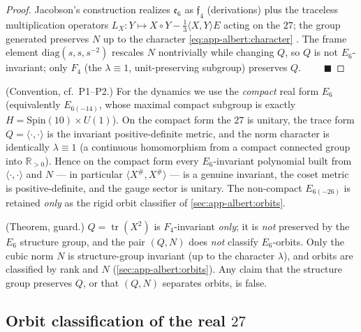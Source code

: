 \begin{proof}
Jacobson's construction realizes $\mathfrak e_6$ as $\mathfrak f_4$ (derivations)
plus the traceless multiplication operators
$L_X:Y\mapsto X\circ Y-\tfrac13\langle X,Y\rangle E$ acting on the $27$; the
group generated preserves $N$ up to the character \eqref{eq:app-albert:character}
\cite{Jacobson:1968}. The frame element $\mathrm{diag}(s,s,s^{-2})$ rescales $N$
nontrivially while changing $Q$, so $Q$ is not $E_6$-invariant; only $F_4$
(the $\lambda\equiv1$, unit-preserving subgroup) preserves $Q$. $\qquad
\blacksquare$
\end{proof}

\begin{postulate}\label{post:app-albert:compact}
\textup{(Convention, cf.\ P1--P2.)}
For the dynamics we use the \emph{compact} real form $E_6$ (equivalently
$E_{6(-14)}$, whose maximal compact subgroup is exactly
$H=\mathrm{Spin}(10)\times U(1)$). On the compact form the $27$ is unitary, the
trace form $Q=\langle\cdot,\cdot\rangle$ is the invariant positive-definite
metric, and the norm character is identically $\lambda\equiv1$ (a continuous
homomorphism from a compact connected group into $\mathbb R_{>0}$). Hence on the
compact form every $E_6$-invariant polynomial built from $\langle\cdot,\cdot
\rangle$ and $N$ --- in particular $\langle X^\#,X^\#\rangle$ --- is a genuine
invariant, the coset metric is positive-definite, and the gauge sector is unitary.
The non-compact $E_{6(-26)}$ is retained \emph{only} as the rigid orbit classifier
of \autoref{sec:app-albert:orbits}.
\end{postulate}

\begin{remark}\label{rmk:app-albert:onlyN}
\textup{(Theorem, guard.)}
$Q=\operatorname{tr}(X^2)$ is $F_4$-invariant \emph{only}; it is \emph{not}
preserved by the $E_6$ structure group, and the pair $(Q,N)$ does \emph{not}
classify $E_6$-orbits. Only the cubic norm $N$ is structure-group invariant (up to
the character $\lambda$), and orbits are classified by rank and $N$
(\autoref{sec:app-albert:orbits}). Any claim that the structure group preserves
$Q$, or that $(Q,N)$ separates orbits, is false.
\end{remark}

\subsection{Orbit classification of the real \texorpdfstring{$27$}{27}}
\label{sec:app-albert:orbits}

